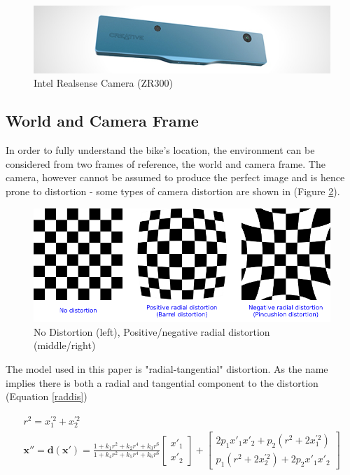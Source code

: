 \documentclass[a4paper,11pt,notitlepage]{article}
\begin{document}
\noindent \begin{figure}[h!]
\includegraphics[width = 1.0\hsize]{./figures/intel_realsense.jpg}
\caption{Intel Realsense Camera (ZR300)}
\label{realsense_camera}
\end{figure}

\subsection{World and Camera Frame}



In order to fully understand the bike's location, the environment can be considered from two frames of reference, the world and camera frame. The camera, however cannot be assumed to produce the perfect image and is hence prone to distortion - some types of camera distortion are shown in (Figure \ref{distortion}).


\noindent \begin{figure}[h!]
	\includegraphics[width = 1\hsize]{figures/distortion_example.png} 
	\caption{No Distortion (left)\cite{opencv_camera_article}, Positive/negative radial distortion (middle/right)}
	\label{distortion}
\end{figure}

The model used in this paper is "radial-tangential" distortion. As the name implies there is both a radial and tangential component to the distortion (Equation \ref{raddis}) 

\begin{equation}
\begin{aligned}
r^{2} = x_{1}^{'2} + x_{2}^{'2} \\
\mathbf{x''} = \mathbf{d(x')} = \frac{1 + k_{1}r^{2} + k_{2}r^{4}+k_{3}r^{6}}{1+ k_{4}r^{2} + k_{5}r^{4}+k_{6}r^{6}}
\begin{bmatrix}
x'_{1} \\[0.3em]
x'_{2}
\end{bmatrix}
+ 
\begin{bmatrix}
2p_{1}x'_{1}x'_{2} + p_{2}(r^{2} + 2x_{1}^{'2}) \\[0.3em]
p_{1}(r^{2} + 2x_{2}^{'2}) + 2p_{2}x'_{1}x'_{2}
\end{bmatrix}
\end{aligned}
\label{raddis}
\end{equation}
\end{document}
